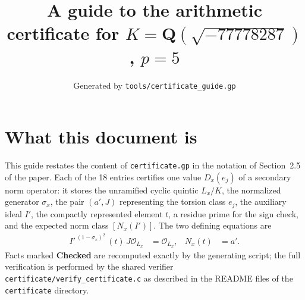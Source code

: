 \documentclass[11pt]{article}
\title{A guide to the arithmetic certificate for $K=\mathbf Q(\sqrt{-77778287})$, $p=5$}
\author{}
\date{Generated by \texttt{tools/certificate\_guide.gp}}
\begin{document}
\maketitle
\section*{What this document is}
This guide restates the content of \texttt{certificate.gp} in the
notation of Section~2.5 of the paper.  Each of the 18 entries
certifies one value $D_x(e_j)$ of a secondary norm operator: it
stores the unramified cyclic quintic $L_x/K$, the normalized
generator $\sigma_x$, the pair $(a',J)$ representing the torsion
class $e_j$, the auxiliary ideal $I'$, the compactly represented
element $t$, a residue prime for the sign check, and the expected
norm class $[N_x(I')]$.  The two defining equations are
\begin{align*}
I'^{\,(1-\sigma_x)^2}\,(t)\,J\mathcal O_{L_x}&=\mathcal O_{L_x},&
N_x(t)&=a'.
\end{align*}
Facts marked \textbf{Checked} are recomputed exactly by the
generating script; the full verification is performed by the
shared verifier \texttt{certificate/verify\_certificate.c} as
described in the README files of the \texttt{certificate}
directory.
\end{document}
